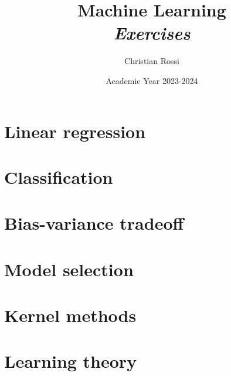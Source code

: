 \documentclass[12pt, a4paper]{report}
\title{Machine Learning \\ \textit{Exercises}}
\author{Christian Rossi}
\date{Academic Year 2023-2024}
\begin{document}
    \maketitle

    

    \cleardoublepage{}

    \tableofcontents

    \cleardoublepage{}

    \chapter{Linear regression}
    
    
    
    

    \chapter{Classification}
    
    
    
    

    \chapter{Bias-variance tradeoff}
    
    
    

    \chapter{Model selection}
    
    
    

    \chapter{Kernel methods}
    
    
    
    
    \chapter{Learning theory}
    
\end{document}
